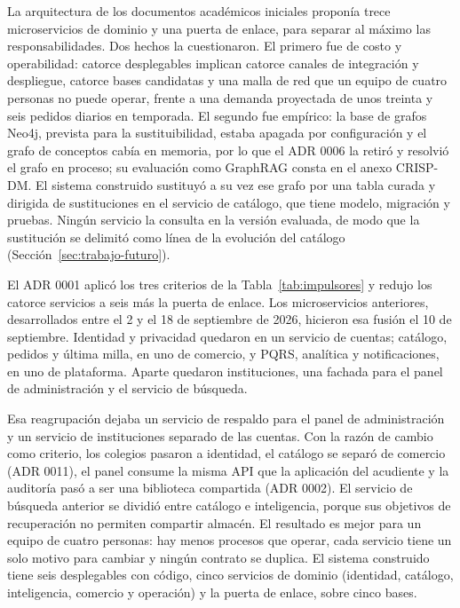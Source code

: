 La arquitectura de los documentos académicos iniciales proponía trece microservicios de
dominio y una puerta de enlace, para separar al máximo las responsabilidades. Dos hechos la
cuestionaron. El primero fue de costo y operabilidad: catorce desplegables implican catorce
canales de integración y despliegue, catorce bases candidatas y una malla de red que un
equipo de cuatro personas no puede operar, frente a una demanda proyectada de unos treinta y
seis pedidos diarios en temporada. El segundo fue empírico: la base de grafos Neo4j,
prevista para la sustituibilidad, estaba apagada por configuración y el grafo de conceptos
cabía en memoria, por lo que el ADR 0006 la retiró y resolvió el grafo en proceso; su
evaluación como GraphRAG consta en el anexo CRISP-DM. El sistema construido sustituyó a su
vez ese grafo por una tabla curada y dirigida de sustituciones en el servicio de catálogo,
que tiene modelo, migración y pruebas. Ningún servicio la consulta en la versión evaluada, de modo que la sustitución se delimitó como línea de la evolución del catálogo (Sección~\ref{sec:trabajo-futuro}).

El ADR 0001 aplicó los tres criterios de la Tabla~\ref{tab:impulsores} y redujo los catorce
servicios a seis más la puerta de enlace. Los microservicios anteriores, desarrollados entre
el 2 y el 18 de septiembre de 2026, hicieron esa fusión el 10 de septiembre. Identidad y
privacidad quedaron en un servicio de cuentas; catálogo, pedidos y última milla, en uno de
comercio, y PQRS, analítica y notificaciones, en uno de plataforma. Aparte quedaron
instituciones, una fachada para el panel de administración y el servicio de búsqueda.

Esa reagrupación
dejaba un servicio de respaldo para el panel de administración y un servicio de
instituciones separado de las cuentas. Con la razón de cambio como criterio, los colegios
pasaron a identidad, el catálogo se separó de comercio (ADR 0011), el panel consume la misma
API que la aplicación del acudiente y la auditoría pasó a ser una biblioteca compartida
(ADR 0002). El servicio de búsqueda anterior se dividió entre catálogo e inteligencia,
porque sus objetivos de recuperación no permiten compartir almacén. El resultado es mejor
para un equipo de cuatro personas: hay menos procesos que operar, cada servicio tiene un
solo motivo para cambiar y ningún contrato se duplica. El sistema construido tiene seis
desplegables con código, cinco servicios de dominio (identidad, catálogo, inteligencia,
comercio y operación) y la puerta de enlace, sobre cinco bases.

